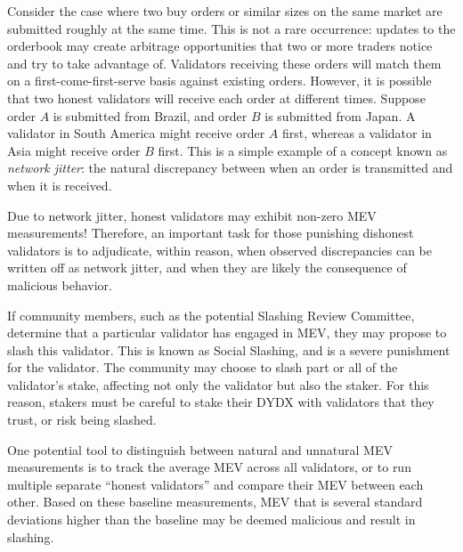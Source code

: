            Consider the case where two buy orders or similar sizes on the same market are submitted roughly at the same time. This is not a rare occurrence: updates to the orderbook may create arbitrage opportunities that two or more traders notice and try to take advantage of. Validators receiving these orders will match them on a first-come-first-serve basis against existing orders. However, it is possible that two honest validators will receive each order at different times. Suppose order $A$ is submitted from Brazil, and order $B$ is submitted from Japan. A validator in South America might receive order $A$ first, whereas a validator in Asia might receive order $B$ first. This is a simple example of a concept known as \textit{network jitter}: the natural discrepancy between when an order is transmitted and when it is received.

            Due to network jitter, honest validators may exhibit non-zero MEV measurements! Therefore, an important task for those punishing dishonest validators is to adjudicate, within reason, when observed discrepancies can be written off as network jitter, and when they are likely the consequence of malicious behavior.

            If community members, such as the potential Slashing Review Committee, determine that a particular validator has engaged in MEV, they may propose to slash this validator. This is known as Social Slashing, and is a severe punishment for the validator. The community may choose to slash part or all of the validator's stake, affecting not only the validator but also the staker. For this reason, stakers must be careful to stake their DYDX with validators that they trust, or risk being slashed.

            One potential tool to distinguish between natural and unnatural MEV measurements is to track the average MEV across all validators, or to run multiple separate ``honest validators'' and compare their MEV between each other. Based on these baseline measurements, MEV that is several standard deviations higher than the baseline may be deemed malicious and result in slashing.


